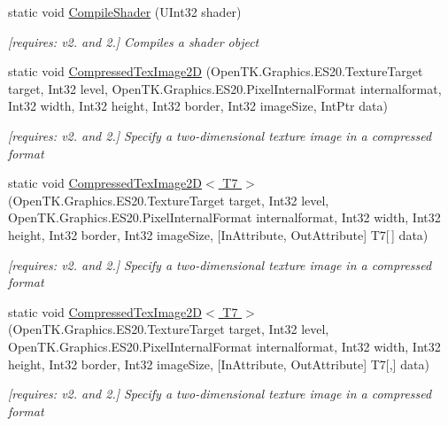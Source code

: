 \begin{DoxyCompactItemize}
static void \hyperlink{class_open_t_k_1_1_graphics_1_1_e_s20_1_1_g_l_afb1e810c07587709de6f154387ab0387}{Compile\-Shader} (U\-Int32 shader)
\begin{DoxyCompactList}\small\item\em \mbox{[}requires\-: v2. and 2.\mbox{]} Compiles a shader object \end{DoxyCompactList}\item 
static void \hyperlink{class_open_t_k_1_1_graphics_1_1_e_s20_1_1_g_l_aa883d71bff0010caee82c9a71734d48b}{Compressed\-Tex\-Image2\-D} (Open\-T\-K.\-Graphics.\-E\-S20.\-Texture\-Target target, Int32 level, Open\-T\-K.\-Graphics.\-E\-S20.\-Pixel\-Internal\-Format internalformat, Int32 width, Int32 height, Int32 border, Int32 image\-Size, Int\-Ptr data)
\begin{DoxyCompactList}\small\item\em \mbox{[}requires\-: v2. and 2.\mbox{]} Specify a two-\/dimensional texture image in a compressed format \end{DoxyCompactList}\item 
static void \hyperlink{class_open_t_k_1_1_graphics_1_1_e_s20_1_1_g_l_aa7d0088babdf1f4c4cfcd5a24f6cb464}{Compressed\-Tex\-Image2\-D$<$ T7 $>$} (Open\-T\-K.\-Graphics.\-E\-S20.\-Texture\-Target target, Int32 level, Open\-T\-K.\-Graphics.\-E\-S20.\-Pixel\-Internal\-Format internalformat, Int32 width, Int32 height, Int32 border, Int32 image\-Size, \mbox{[}In\-Attribute, Out\-Attribute\mbox{]} T7\mbox{[}$\,$\mbox{]} data)
\begin{DoxyCompactList}\small\item\em \mbox{[}requires\-: v2. and 2.\mbox{]} Specify a two-\/dimensional texture image in a compressed format \end{DoxyCompactList}\item 
static void \hyperlink{class_open_t_k_1_1_graphics_1_1_e_s20_1_1_g_l_af7a60be761455e06da32b2b7ecfd9d47}{Compressed\-Tex\-Image2\-D$<$ T7 $>$} (Open\-T\-K.\-Graphics.\-E\-S20.\-Texture\-Target target, Int32 level, Open\-T\-K.\-Graphics.\-E\-S20.\-Pixel\-Internal\-Format internalformat, Int32 width, Int32 height, Int32 border, Int32 image\-Size, \mbox{[}In\-Attribute, Out\-Attribute\mbox{]} T7\mbox{[},\mbox{]} data)
\begin{DoxyCompactList}\small\item\em \mbox{[}requires\-: v2. and 2.\mbox{]} Specify a two-\/dimensional texture image in a compressed format \end{DoxyCompactList}\item 

\end{DoxyCompactItemize}
